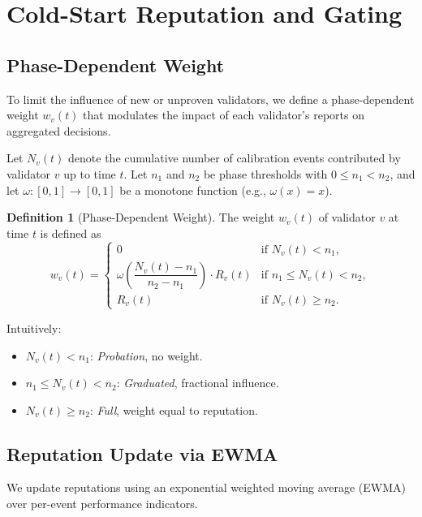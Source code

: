 \documentclass[11pt]{article}
\theoremstyle{plain}
\theoremstyle{definition}
\newtheorem{definition}{Definition}
\begin{document}
\section{Cold-Start Reputation and Gating}

\subsection{Phase-Dependent Weight}

To limit the influence of new or unproven validators, we define a phase-dependent weight \(w_v(t)\) that modulates the impact of each validator's reports on aggregated decisions.

Let \(N_v(t)\) denote the cumulative number of calibration events contributed by validator \(v\) up to time \(t\). Let \(n_1\) and \(n_2\) be phase thresholds with \(0 \le n_1 < n_2\), and let \(\omega : [0,1] \to [0,1]\) be a monotone function (e.g., \(\omega(x)=x\)).

\begin{definition}[Phase-Dependent Weight]
The weight \(w_v(t)\) of validator \(v\) at time \(t\) is defined as
\[
w_v(t) =
\begin{cases}
0 & \text{if } N_v(t) < n_1,\\[6pt]
\omega\!\left(\dfrac{N_v(t) - n_1}{n_2 - n_1}\right) \cdot R_v(t) & \text{if } n_1 \le N_v(t) < n_2,\\[6pt]
R_v(t) & \text{if } N_v(t) \ge n_2.
\end{cases}
\]
\end{definition}

Intuitively:
\begin{itemize}[leftmargin=*]
  \item \(N_v(t) < n_1\): \emph{Probation}, no weight.
  \item \(n_1 \le N_v(t) < n_2\): \emph{Graduated}, fractional influence.
  \item \(N_v(t) \ge n_2\): \emph{Full}, weight equal to reputation.
\end{itemize}

\subsection{Reputation Update via EWMA}

We update reputations using an exponential weighted moving average (EWMA) over per-event performance indicators.
\end{document}
